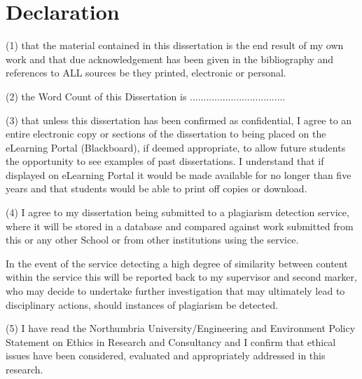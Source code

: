 \chapter{Declaration}
(1) that the material contained in this dissertation is the end result of my own work and that due acknowledgement has been given in the bibliography and references to ALL sources be they printed, electronic or personal.

(2) the Word Count of this Dissertation is ...................................

(3) that unless this dissertation has been confirmed as confidential, I agree to an entire electronic copy or sections of the dissertation to being placed on the eLearning Portal (Blackboard), if deemed appropriate, to allow future students the opportunity to see examples of past dissertations.  I understand that if displayed on eLearning Portal it would be made available for no longer than five years and that students would be able to print off copies or download.  

(4) I agree to my dissertation being submitted to a plagiarism detection service, where it will be stored in a database and compared against work submitted from this or any other School or from other institutions using the service.  

In the event of the service detecting a high degree of similarity between content within the service this will be reported back to my supervisor and second marker, who may decide to undertake further investigation that may ultimately lead to disciplinary actions, should instances of plagiarism be detected.

(5) I have read the Northumbria University/Engineering and Environment Policy Statement on Ethics in Research and Consultancy and I confirm that ethical issues have been considered, evaluated and appropriately addressed in this research.
 

